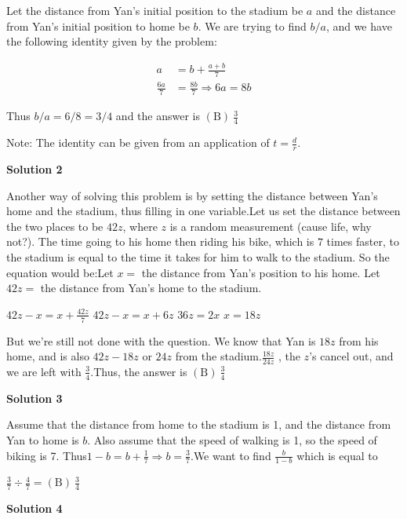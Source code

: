 \begin{enumerate}
Let the distance from Yan's initial position to the stadium be $a$ and the distance from Yan's initial position to home be $b$. We are trying to find $b/a$, and we have the following identity given by the problem:

 
 \begin{align*}a &= b + \frac{a+b}{7}\\ \frac{6a}{7} &= \frac{8b}{7} \Longrightarrow 6a = 8b\end{align*}


 Thus $b/a = 6/8 = 3/4$ and the answer is $\mathrm{(B)}\ \frac{3}{4}$

 Note: The identity can be given from an application of $t=\frac dr$.

 



\textbf{Solution 2}

Another way of solving this problem is by setting the distance between Yan's home and the stadium, thus filling in one variable.Let us set the distance between the two places to be $42z$, where $z$ is a random measurement (cause life, why not?). The time going to his home then riding his bike, which is $7$ times faster, to the stadium is equal to the time it takes for him to walk to the stadium. So the equation would be:Let $x=$ the distance from Yan's position to his home. Let $42z=$ the distance from Yan's home to the stadium.

 $42z-x=x+\frac{42z}{7}$
$42z-x=x+6z$
$36z=2x$
$x=18z$

 But we're still not done with the question. We know that Yan is $18z$ from his home, and is also $42z-18z$ or $24z$ from the stadium.$\frac{18z}{24z}$  , the $z$'s cancel out, and we are left with $\frac{3}{4}$.Thus, the answer is $\mathrm{(B)}\ \frac{3}{4}$




\textbf{Solution 3}

Assume that the distance from home to the stadium is 1, and the distance from Yan to home is $b$. Also assume that the speed of walking is 1, so the speed of biking is 7. Thus$1-b=b+\frac{1}{7} \Longrightarrow b=\frac{3}{7}$.We want to find $\frac{b}{1-b}$ which is equal to

 $\frac{3}{7} \div \frac{4}{7} = \mathrm{(B)}\ \frac{3}{4}$




\textbf{Solution 4}



\end{enumerate}
